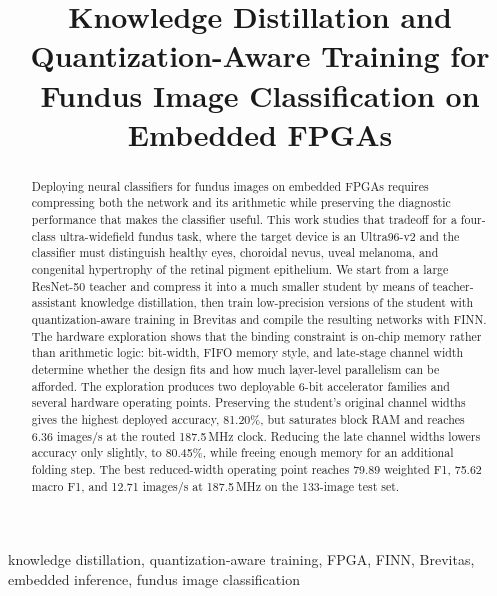 \documentclass[conference]{IEEEtran}
\begin{document}
\title{Knowledge Distillation and Quantization-Aware Training for Fundus Image Classification on Embedded FPGAs}

\author{
}

\maketitle

\begin{abstract}
Deploying neural classifiers for fundus images on embedded FPGAs requires
compressing both the network and its arithmetic while preserving the diagnostic
performance that makes the classifier useful. This work studies that tradeoff for
a four-class ultra-widefield fundus task, where the target device is an
Ultra96-v2 and the classifier must distinguish healthy eyes, choroidal nevus,
uveal melanoma, and congenital hypertrophy of the retinal pigment epithelium. We
start from a large ResNet-50 teacher and compress it into a much smaller student by
means of teacher-assistant knowledge distillation, then train low-precision
versions of the student with quantization-aware training in Brevitas and compile
the resulting networks with FINN. The hardware exploration shows that the binding
constraint is on-chip memory rather than arithmetic logic: bit-width, FIFO memory
style, and late-stage channel width determine whether the design fits and how
much layer-level parallelism can be afforded. The exploration produces two
deployable 6-bit accelerator families and several hardware operating points.
Preserving the student's original channel widths gives the highest deployed
accuracy, 81.20\%, but saturates block RAM and reaches 6.36 images/s at the
routed 187.5\,MHz clock. Reducing the late channel widths lowers accuracy only
slightly, to 80.45\%, while freeing enough memory for an additional folding step.
The best reduced-width operating point reaches 79.89 weighted F1, 75.62 macro F1,
and 12.71 images/s at 187.5\,MHz on the 133-image test set.
\end{abstract}

\begin{IEEEkeywords}
knowledge distillation, quantization-aware training, FPGA, FINN, Brevitas, embedded inference, fundus image classification
\end{IEEEkeywords}









\end{document}
